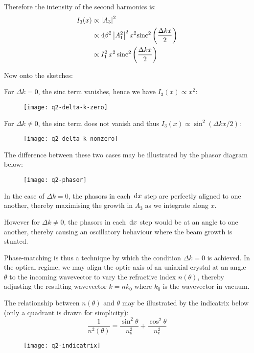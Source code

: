 \begin{parts}
	Therefore the intensity of the second harmonics is:
	\begin{align*}
		I_3 (x) &\propto \left|A_3\right|^2 \\
		&\propto 4\beta^2 \left|A_1^2\right|^2 x^2 \textnormal{sinc}^2\left(\frac{\Delta kx}{2}\right) \\
		&\propto I_1^2 \, x^2 \, \textnormal{sinc}^2\left(\frac{\Delta kx}{2}\right)
	\end{align*}
	
	\newpage
	Now onto the sketches:
	\begin{subparts}
		\subpart For $\Delta k = 0$, the sinc term vanishes, hence we have $I_3 (x) \propto x^2$:
		\begin{figure}[H]
			\centering
			\texttt{[image: q2-delta-k-zero]}
		\end{figure}
		
		\subpart For $\Delta k \neq 0$, the sinc term does not vanish and thus $I_3 (x) \propto \sin^2(\Delta kx/2)$:
		\begin{figure}[H]
			\centering
			\texttt{[image: q2-delta-k-nonzero]}
		\end{figure}
	\end{subparts}
	The difference between these two cases may be illustrated by the phasor diagram below:
	\begin{figure}[H]
		\centering
		\texttt{[image: q2-phasor]}
	\end{figure}
	In the case of $\Delta k = 0$, the phasors in each $\,\mathrm{d}{x}$ step are perfectly aligned to one another, thereby maximising the growth in $A_3$ as we integrate along $x$.
	
	However for $\Delta k \neq 0$, the phasors in each $\,\mathrm{d}{x}$ step would be at an angle to one another, thereby causing an oscillatory behaviour where the beam growth is stunted.
	
	Phase-matching is thus a technique by which the condition $\Delta k = 0$ is achieved.
	In the optical regime, we may align the optic axis of an uniaxial crystal at an angle $\theta$ to the incoming wavevector to vary the refractive index $n(\theta)$, thereby adjusting the resulting wavevector $k=nk_0$ where $k_0$ is the wavevector in vacuum.
	
	The relationship between $n(\theta)$ and $\theta$ may be illustrated by the indicatrix below (only a quadrant is drawn for simplicity):
	\begin{equation*}
		\frac{1}{n^2(\theta)} = \frac{\sin^2 \theta}{n_o^2} + \frac{\cos^2 \theta}{n_e^2}
	\end{equation*}
	\begin{figure}[H]
		\centering
		\texttt{[image: q2-indicatrix]}
	\end{figure}
	

\end{parts}
